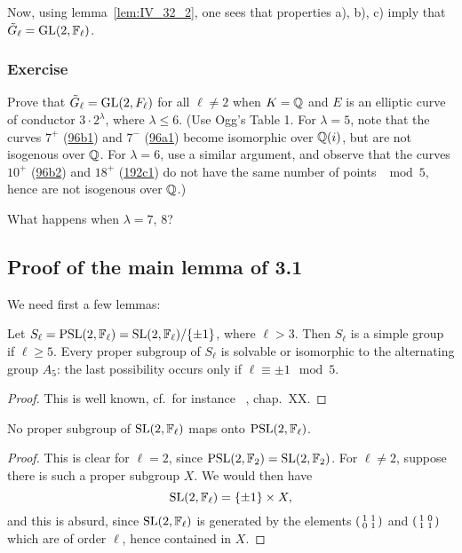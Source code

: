 Now, using lemma~\ref{lem:IV_32_2}, one sees that properties a), b), c) imply
that $\tilde{G}_\ell = \operatorname{GL}(2, \mathbb{F}_\ell)$.  

\subsubsection*{Exercise}

Prove that $\tilde{G}_\ell = \operatorname{GL}(2, F_\ell)$ for all $\ell \neq 2$ when $K = \mathbb{Q}$
and $E$ is an elliptic curve of conductor $3 \cdot 2^\lambda$, where $\lambda
\leq 6$. (Use Ogg's Table 1. For $\lambda = 5$, note that the curves $7^+$
(\href{https://www.lmfdb.org/EllipticCurve/Q/96/b/1}{\ttfamily 96b1}) and
$7^-$ (\href{https://www.lmfdb.org/EllipticCurve/Q/96/a/1}{\ttfamily 96a1})
become isomorphic over $\mathbb{Q}(i)$, but are not isogenous over $\mathbb{Q}$.
For $\lambda = 6$, use a similar argument, and observe that the curves $10^+$
(\href{https://www.lmfdb.org/EllipticCurve/Q/96/b/2}{\ttfamily 96b2}) and
$18^+$ (\href{https://www.lmfdb.org/EllipticCurve/Q/192/c/1}{\ttfamily 192c1})
do not have the same number of points $\mod 5$, hence are not isogenous
over $\mathbb{Q}$.)

What happens when $\lambda = 7$, $8$?

\subsection{Proof of the main lemma of 3.1}
\label{sec:IV_34}
\dpage
We need first a few lemmas:
\begin{lem}\label{lem:IV_34_1}
	Let $S_\ell = \operatorname{PSL}(2, \mathbb{F}_\ell) = \operatorname{SL}(2, \mathbb{F}_\ell)/\{ \pm 1 \}$, where
	$\ell > 3$.
	Then $S_\ell$ is a simple group if $\ell \ge 5$. Every proper subgroup
	of $S_\ell$ is solvable or isomorphic to the alternating group $A_5$:
	the last possibility occurs only if $\ell \equiv \pm 1 \mod 5$.
\end{lem}
\begin{proof}
	This is well known, cf.\ for instance \citeauthor{4}~\cite{4}, chap.\ XX.
\end{proof}

\begin{lem}\label{lem:IV_34_2}
	No proper subgroup of $\operatorname{SL}(2, \mathbb{F}_\ell)$ maps onto $\operatorname{PSL}(2, \mathbb{F}_\ell)$.
\end{lem}
\begin{proof}
	This is clear for $\ell = 2$, since $\operatorname{PSL}(2, \mathbb{F}_2) = \operatorname{SL}(2, \mathbb{F}_2)$. For
	$\ell \ne 2$, suppose there is such a proper subgroup $X$. We would then
	have
	\[
		\operatorname{SL}(2, \mathbb{F}_\ell) = \{ \pm 1 \}\times X,
	\]
	and this is absurd, since $\operatorname{SL}(2, \mathbb{F}_\ell)$ is generated by the elements
	$\begin{psmallmatrix}
		1 & 1 \\
		0 & 1
	\end{psmallmatrix}$
	and
	$\begin{psmallmatrix}
		1 & 0 \\
		1 & 1
	\end{psmallmatrix}$
	which are of order $\ell$, hence contained in $X$.
\end{proof}

